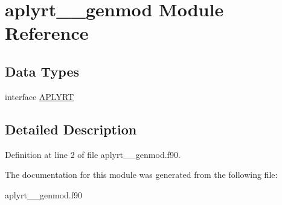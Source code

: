 \hypertarget{classaplyrt____genmod}{\section{aplyrt\+\_\+\+\_\+genmod Module Reference}
\label{classaplyrt____genmod}
}
\subsection*{Data Types}
\begin{DoxyCompactItemize}
\item 
interface \hyperlink{interfaceaplyrt____genmod_1_1_a_p_l_y_r_t}{A\+P\+L\+Y\+R\+T}
\end{DoxyCompactItemize}


\subsection{Detailed Description}


Definition at line 2 of file aplyrt\+\_\+\+\_\+genmod.\+f90.



The documentation for this module was generated from the following file\+:\begin{DoxyCompactItemize}
\item 
aplyrt\+\_\+\+\_\+genmod.\+f90\end{DoxyCompactItemize}
